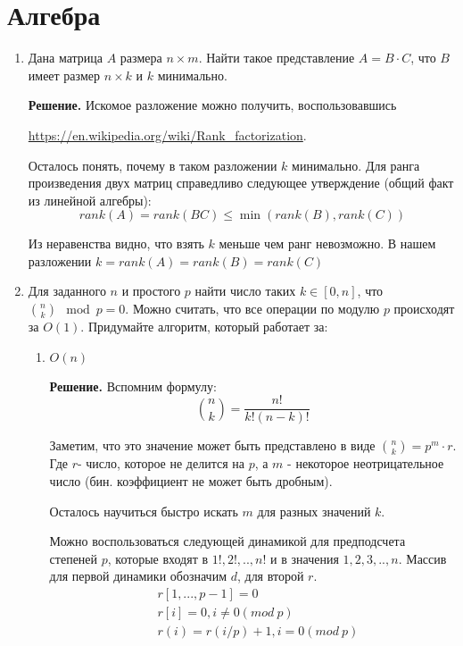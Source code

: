 \section*{Алгебра}
\begin{enumerate}
	\item Дана матрица $A$ размера $n \times m$. Найти такое представление $A = B \cdot C$, что $B$ имеет размер 
	$n\times k$ и $k$ минимально.
	
	\textbf{Решение.} Искомое разложение можно получить, воспользовавшись
	
	\url{https://en.wikipedia.org/wiki/Rank_factorization}.
	 
	Осталось понять, почему в таком разложении $k$ минимально. Для ранга произведения двух матриц справедливо 
	следующее утверждение (общий факт из линейной алгебры):
	\begin{equation*}
		rank(A) = rank(BC) \leqslant \min(rank(B), rank(C))
	\end{equation*}
	 
	Из неравенства видно, что взять $k$ меньше чем ранг невозможно. В нашем разложении $k = rank(A) = rank(B) = 
	rank(C)$
	
	\item Для заданного $n$ и простого $p$ найти число таких $k \in [0, n]$, что $\binom{n}{k} \mod p = 0$. Можно 
	считать, что все операции по модулю $p$ происходят за $O(1)$. Придумайте алгоритм, который работает за:
	\begin{enumerate}
		\item $O(n)$
		
		\textbf{Решение.} Вспомним формулу:
		\begin{equation*}
		\binom{n}{k} = \frac{n!}{k!(n - k)!}
		\end{equation*}
		
		Заметим, что это значение может быть представлено в виде $\binom{n}{k} = p^m \cdot r$. Где $r$- число, 
		которое не делится на $p$, а $m$ - некоторое неотрицательное число (бин. коэффициент не может быть 
		дробным).
		
		Осталось научиться быстро искать $m$ для разных значений $k$.
		
		Можно воспользоваться следующей динамикой для предподсчета степеней $p$, которые входят в $1!, 2!, .., 
		n!$ и в значения $1,2,3, .., n$. Массив для первой динамики обозначим $d$, для второй $r$.
		\begin{align*}
			&r[1, ..., p - 1] = 0 \\
			&r[i] = 0, i \neq 0 (mod \ p) \\
			&r(i) = r(i / p) + 1, i = 0(mod \ p)
		\end{align*}
		

\end{enumerate}
\end{enumerate}

